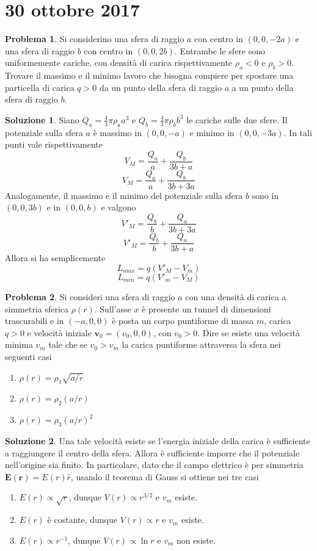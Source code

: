 \documentclass[a4paper,11pt]{book}
\renewcommand{\vec}[1]{\mathbf{#1}}
\theoremstyle{theorem}
\theoremstyle{definition}
\newtheorem{problema}{Problema}[section]
\newtheorem{soluzione}{Soluzione}[section]
\begin{document}
\section{30 ottobre 2017}
\begin{problema}
	Si considerino una sfera di raggio $a$ con centro in $(0,0,-2a)$ e una sfera di raggio $b$ con centro in $(0,0,2b)$. Entrambe le sfere sono uniformemente cariche, con densità di carica rispettivamente $\rho_a<0$ e $\rho_b>0$. Trovare il massimo e il minimo lavoro che bisogna compiere per spostare una particella di carica $q>0$ da un punto della sfera di raggio $a$ a un punto della sfera di raggio $b$.
\end{problema}
\begin{soluzione}
	Siano $Q_a=\frac{4}{3}\pi\rho_aa^3$ e $Q_b=\frac{4}{3}\pi\rho_bb^3$ le cariche sulle due sfere. Il potenziale sulla sfera $a$ è massimo in $(0,0,-a)$ e minimo in $(0,0,-3a)$. In tali punti vale rispettivamente
	\[V_M=\frac{Q_a}{a}+\frac{Q_b}{3b+a}\]
	\[V_M=\frac{Q_a}{a}+\frac{Q_b}{3b+3a}\]
	Analogamente, il massimo e il minimo del potenziale sulla sfera $b$ sono in $(0,0,3b)$ e in $(0,0,b)$ e valgono
	\[V'_M=\frac{Q_b}{b}+\frac{Q_a}{3b+3a}\]
	\[V'_M=\frac{Q_b}{b}+\frac{Q_a}{3b+a}\]
	Allora si ha semplicemente
	\[L_{max}=q(V'_M-V_m)\]
	\[L_{min}=q(V'_m-V_M)\]
\end{soluzione}
\begin{problema}
	Si consideri una sfera di raggio $a$ con una densità di carica a simmetria sferica $\rho(r)$. Sull'asse $x$ è presente un tunnel di dimensioni trascurabili e in $(-a,0,0)$ è posta un corpo puntiforme di massa $m$, carica $q>0$ e velocità iniziale $\vec{v}_0=(v_0,0,0)$, con $v_0>0$. Dire se esiste una velocità minima $v_m$ tale che se $v_0>v_m$ la carica puntiforme attraversa la sfera nei seguenti casi
	\begin{enumerate}
		\item $\rho(r)=\rho_1\sqrt{a/r}$
		\item $\rho(r)=\rho_2(a/r)$
		\item $\rho(r)=\rho_3(a/r)^2$
	\end{enumerate}	
\end{problema}
\begin{soluzione}
	Una tale velocità esiste se l'energia iniziale della carica è sufficiente a raggiungere il centro della sfera. Allora è sufficiente imporre che il potenziale nell'origine sia finito. In particolare, dato che il campo elettrico è per simmetria $\vec{E}(\vec{r})=E(r)\hat{r}$, usando il teorema di Gauss si ottiene nei tre casi
	\begin{enumerate}
		\item $E(r)\propto \sqrt{r}$, dunque $V(r)\propto r^{3/2}$ e $v_m$ esiste.
		\item $E(r)$ è costante, dunque $V(r)\propto r$ e $v_m$ esiste.
		\item $E(r)\propto r^{-1}$, dunque $V(r)\propto \ln r$ e $v_m$ non esiste.
	\end{enumerate}
\end{soluzione}
\end{document}
